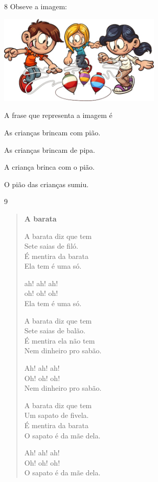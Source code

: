 \num{8} Obseve a imagem:

\includegraphics[width=3.05095in,height=1.66841in]{media/image144.jpeg}


A frase que representa a imagem é

\begin{escolha}
\item As crianças brincam com pião.

\item As crianças brincam de pipa.

\item A criança brinca com o pião.

\item O pião das crianças sumiu.
\end{escolha}

\num{9}

\begin{verse}
\textbf{A barata}

A barata diz que tem\\
Sete saias de filó.\\
É mentira da barata\\
Ela tem é uma só.

ah! ah! ah!\\
oh! oh! oh!\\
Ela tem é uma só.

A barata diz que tem\\
Sete saias de balão.\\
É mentira ela não tem\\
Nem dinheiro pro sabão.

Ah! ah! ah!\\
Oh! oh! oh!\\
Nem dinheiro pro sabão.

A barata diz que tem\\
Um sapato de fivela.\\
É mentira da barata\\
O sapato é da mãe dela.

Ah! ah! ah!\\
Oh! oh! oh!\\
O sapato é da mãe dela.
\end{verse}

